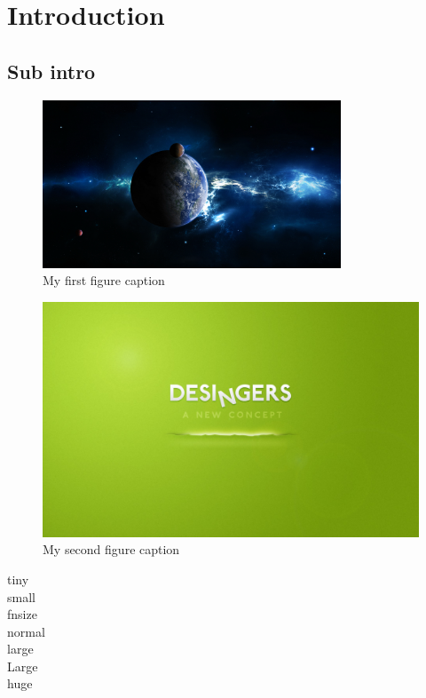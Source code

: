 \documentclass[12pt,onecolumn,a4paper,portrait]{article}
\begin{document}
\section{Introduction}
\blinetext
\subsection{Sub intro}
\begin{figure}[!ht]

\includegraphics[width=\linewidth,height=5cm]{./images/1.jpg}
\caption{My first figure caption\label{fig:1}}
\end{figure}


\begin{figure}[!bp]

\includegraphics[width=\linewidth]{./images/2.jpg}
\caption{My second figure caption\label{fig:2}}
\end{figure}



\tiny{tiny}\\
\small{small}\\
\footnotesize{fnsize}\\
normal\\
\large{large}\\
\Large{Large}
\\\huge{huge}\\
\end{document}
